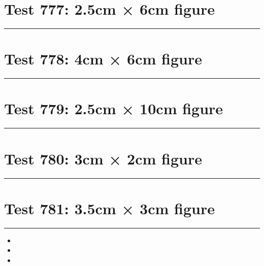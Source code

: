 \documentclass[a4paper,11pt]{article}
\begin{document}
\section*{Test 777: 2.5cm × 6cm figure}
\begin{swarmwrap}%
  \begin{minipage}[t]{2cm}
    \centering
    \rule{\linewidth}{6cm}
  \end{minipage}%
\end{swarmwrap}%
\swarmwrapnext
\lipsum[65]
\lipsum[66]
\lipsum[67]
\section*{Test 778: 4cm × 6cm figure}
\begin{swarmwrap}%
  \begin{minipage}[t]{4cm}
    \centering
    \rule{\linewidth}{6cm}
  \end{minipage}%
\end{swarmwrap}%
\swarmwrapnext
\lipsum[79]
\lipsum[80]
\lipsum[81]
\section*{Test 779: 2.5cm × 10cm figure}
\begin{swarmwrap}%
  \begin{minipage}[t]{2cm}
    \centering
    \rule{\linewidth}{10cm}
  \end{minipage}%
\end{swarmwrap}%
\swarmwrapnext
\lipsum[102]
\lipsum[103]
\lipsum[104]
\lipsum[105]
\section*{Test 780: 3cm × 2cm figure}
\begin{swarmwrap}%
  \begin{minipage}[t]{3cm}
    \centering
    \rule{\linewidth}{2cm}
  \end{minipage}%
\end{swarmwrap}%
\swarmwrapnext
\lipsum[128]
\lipsum[129]
\lipsum[130]
\lipsum[131]
\section*{Test 781: 3.5cm × 3cm figure}
\begin{swarmwrap}%
  \begin{minipage}[t]{3cm}
    \centering
    \rule{\linewidth}{3cm}
  \end{minipage}%
\end{swarmwrap}
\begin{itemize}
  \item \swarmwrapnext\lipsum[128][1-4]
  \item \lipsum[130][1-3]
  \item \lipsum[131][1-3]
\end{itemize}
\end{document}
